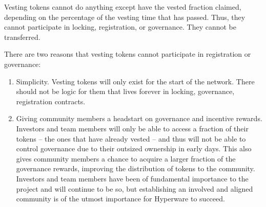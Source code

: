 \documentclass{article}
\begin{document}
Vesting tokens cannot do anything except have the vested fraction claimed, depending on the percentage of the vesting time that has passed.
Thus, they cannot participate in locking, registration, or governance.
They cannot be transferred.

There are two reasons that vesting tokens cannot participate in registration or governance:
\begin{enumerate}
    \item Simplicity.
         Vesting tokens will only exist for the start of the network.
         There should not be logic for them that lives forever in locking, governance, registration contracts.
    \item Giving community members a headstart on governance and incentive rewards.
         Investors and team members will only be able to access a fraction of their tokens -- the ones that have already vested -- and thus will not be able to control governance due to their outsized ownership in early days.
         This also gives community members a chance to acquire a larger fraction of the governance rewards, improving the distribution of tokens to the community.
         Investors and team members have been of fundamental importance to the project and will continue to be so, but establishing an involved and aligned community is of the utmost importance for Hyperware to succeed.
\end{enumerate}
\end{document}
